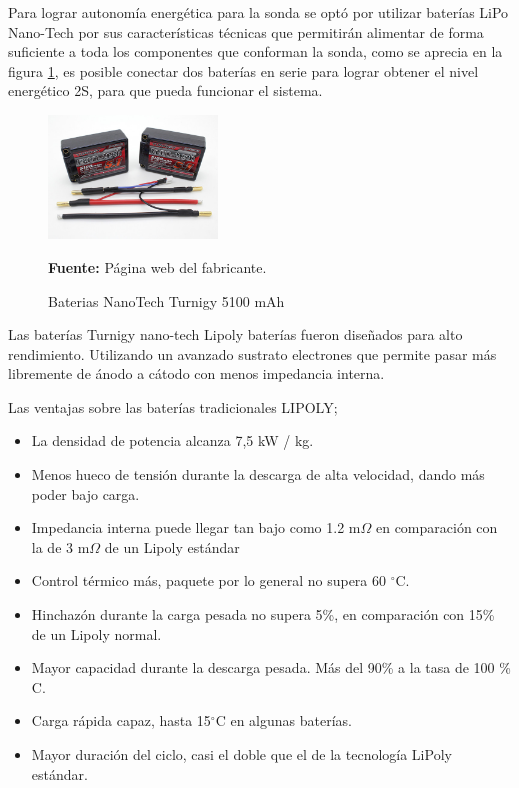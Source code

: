 Para lograr autonom\'ia energ\'etica para la sonda se opt\'o por utilizar bater\'ias LiPo Nano-Tech por sus caracter\'isticas t\'ecnicas que permitir\'an alimentar de forma suficiente a toda los componentes que conforman la sonda, como se aprecia en la figura \ref{fig:nanoBateria}, es posible conectar dos baterías en serie para lograr obtener el nivel energético 2S, para que pueda funcionar el sistema.  
    \begin{figure}[H]
        \centering
        \includegraphics[width=0.4\textwidth]{Imagenes/2021/imag29.jpg}
        \caption{Baterias NanoTech Turnigy 5100 mAh}\textbf{Fuente:} P\'agina web del fabricante.
        \label{fig:nanoBateria}
    \end{figure}
Las bater\'ias Turnigy nano-tech Lipoly bater\'ias fueron dise\~nados para alto rendimiento. Utilizando un avanzado sustrato electrones que permite pasar m\'as libremente de \'anodo a c\'atodo con menos impedancia interna.
 
Las ventajas sobre las bater\'ias tradicionales LIPOLY;
\begin{itemize}
    \item La densidad de potencia alcanza 7,5 kW / kg.
    \item Menos hueco de tensi\'on durante la descarga de alta velocidad, dando m\'as poder bajo carga.
    \item Impedancia interna puede llegar tan bajo como 1.2 m${\Omega }$ en comparación con la de 3 m${\Omega }$ de un Lipoly estándar
    \item Control t\'ermico m\'as, paquete por lo general no supera 60 $^{\circ}$C.
    \item Hinchazón durante la carga pesada no supera 5\%, en comparación con 15\% de un Lipoly normal.
    \item Mayor capacidad durante la descarga pesada. M\'as del 90\% a la tasa de 100 \% C.
    \item Carga r\'apida capaz, hasta 15$^{\circ}$C en algunas baterías.
    \item Mayor duraci\'on del ciclo, casi el doble que el de la tecnolog\'ia LiPoly est\'andar.
\end{itemize}

